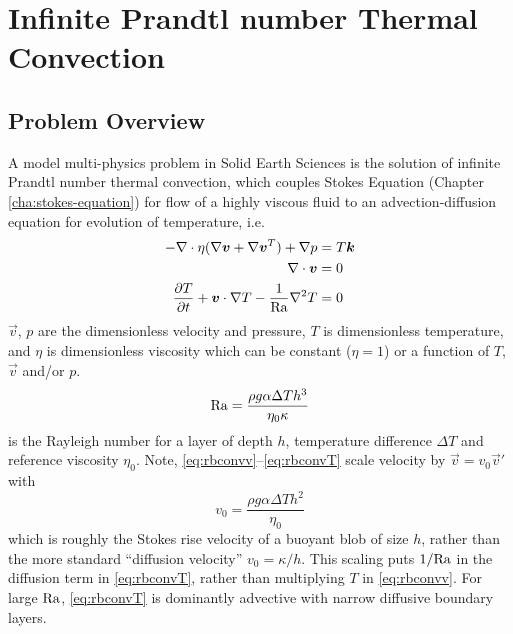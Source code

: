 \chapter{Infinite Prandtl number Thermal Convection}
\label{cha:thermal-convection}

\section{Problem Overview}
\label{sec:convection_problem-formulation}

A model multi-physics  problem in Solid Earth Sciences is the solution of
infinite Prandtl number thermal convection, which couples Stokes
Equation (Chapter \ref{cha:stokes-equation}) for flow of a highly
viscous fluid to an advection-diffusion
equation for evolution of temperature, i.e.
\begin{align}
-\nabla\cdot\eta(\nabla{\mbox{\boldmath$v$}} + \nabla{\mbox{\boldmath$v$}}^{T}) + \nabla p & = T{\mbox{\boldmath$k$}} \label{eq:rbconvv}\\ 
\nabla\cdot {\mbox{\boldmath$v$}} &= 0  \label{eq:rbconvp}\\
  \frac{\partial T}{\partial t} + {\mbox{\boldmath$v$}}\cdot\nabla T - \frac{1}{\mathrm{Ra}}\nabla^2 T &= 0 \label{eq:rbconvT}
\end{align}
$\vec{v}$, $p$ are the dimensionless velocity and pressure, $T$ is
dimensionless temperature, and $\eta$ is dimensionless viscosity which
can be constant ($\eta=1$) or a function of $T$, $\vec{v}$ and/or $p$.
\begin{displaymath}
  \mathrm{Ra} = \frac{\rho g \alpha \Delta T h^{3}}{\eta_{0}\kappa}
\end{displaymath}
is the Rayleigh number for a layer of depth $h$, temperature
difference $\Delta T$ and reference viscosity $\eta_{0}$. 
Note, \eqref{eq:rbconvv}--\eqref{eq:rbconvT} scale velocity by
$\vec{v}=v_0\vec{v}'$ with
\begin{equation}
  \label{eq:6}
  v_0 = \frac{\rho g\alpha\Delta T h^{2}}{\eta_0}
\end{equation}
which is roughly the Stokes rise velocity of a buoyant blob of size $h$, rather than the
more standard ``diffusion velocity'' $v_0=\kappa/h$. This
scaling puts $1/\mathrm{Ra}$ in the diffusion term in \eqref{eq:rbconvT}, rather
than multiplying $T$ in \eqref{eq:rbconvv}. For large $\mathrm{Ra}$, \eqref{eq:rbconvT}
is dominantly advective with narrow diffusive boundary layers. 

